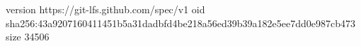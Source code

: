 version https://git-lfs.github.com/spec/v1
oid sha256:43a9207160411451b5a31dadbfd4be218a56ed39b39a182e5ee7dd0e987cb473
size 34506
